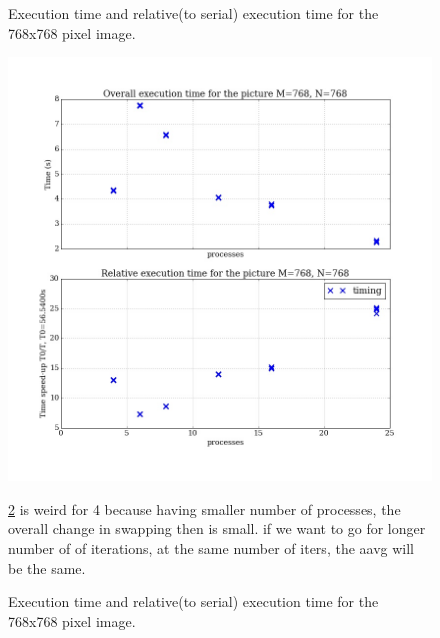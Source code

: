 \documentclass[11pt]{article}
\begin{document}
\begin{figure}[ht]
\begin{minipage}[b]{.5\textwidth}
			\caption{Execution time and relative(to serial) execution time for the 768x768 pixel image.}\label{exec_4}
		\end{minipage}
	\end{figure}

	\begin{figure}[ht]	
		\centering
		\begin{minipage}[b]{.5\textwidth}
			\centering
			\includegraphics[width=\linewidth]{exec_768x768_odd.jpeg}
			\caption{Execution time and relative(to serial) execution time for the 768x768 pixel image.}\label{exec_4odd}
		\end{minipage}%
		\begin{minipage}[b]{.5\textwidth}
			\ref{exec_4odd} is weird for 4 because having smaller number of processes, the overall change in swapping then is small. if we want to go for longer number of of iterations, at the same number of iters, the aavg will be the same. 
		\end{minipage}
	\end{figure}
	
\end{document}
